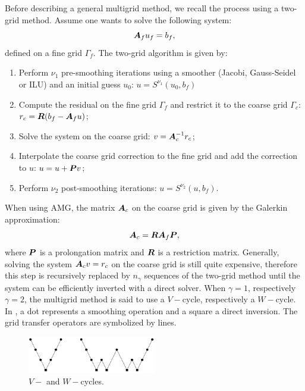Before describing a general multigrid method, we recall the process using a 
two-grid method. Assume one wants to solve the following system:
\begin{equation}
  \boldsymbol{A}_f u_f = b_f,
\end{equation}
defined on a fine grid $\Gamma_f$. The two-grid algorithm is given by:
\begin{enumerate}
  \item Perform $\nu_1$ pre-smoothing iterations using a smoother (Jacobi,
    Gauss-Seidel or ILU) and an initial guess $u_0$: $u = S^{\nu_1}(u_0,b_f)$
  \item Compute the residual on the fine grid $\Gamma_f$ and restrict it to
    the coarse grid $\Gamma_c$: $r_c = \boldsymbol{R}(b_f-\boldsymbol{A}_f u)$;
  \item Solve the system on the coarse grid: $v=\boldsymbol{A}_c^{-1} r_c$;
  \item Interpolate the coarse grid correction to the fine grid and add the
    correction to $u$: $u=u+\boldsymbol{P}v$;
  \item Perform $\nu_2$ post-smoothing iterations: $u = S^{\nu_2}(u,b_f)$.
\end{enumerate}
When using AMG, the matrix $\boldsymbol{A}_c$ on the coarse grid is given by the
Galerkin approximation:
\begin{equation}
  \boldsymbol{A}_c = \boldsymbol{R} \boldsymbol{A}_f \boldsymbol{P},
\end{equation}
where $\boldsymbol{P}$ is a prolongation matrix and $\boldsymbol{R}$ is a restriction matrix. 
Generally, solving the system $\boldsymbol{A}_c v = r_c$ on the coarse grid is still
quite expensive, therefore this step is recursively replaced by $n_{\gamma}$
sequences of the two-grid method until the system can be efficiently inverted 
with a direct solver.
When $\gamma = 1$, respectively $\gamma =
2$, the multigrid method is said to use a $V-$cycle, respectively a $W-$cycle. 
In , a dot represents a smoothing operation and a square a
direct inversion. The grid transfer operators are symbolized by lines.
\begin{figure}[H]
  \centering
  \includegraphics[width=0.5\textwidth]{v_w_cycles}
  \caption{$V-$ and $W-$cycles.}
  \label{fig_v_w}
\end{figure}

